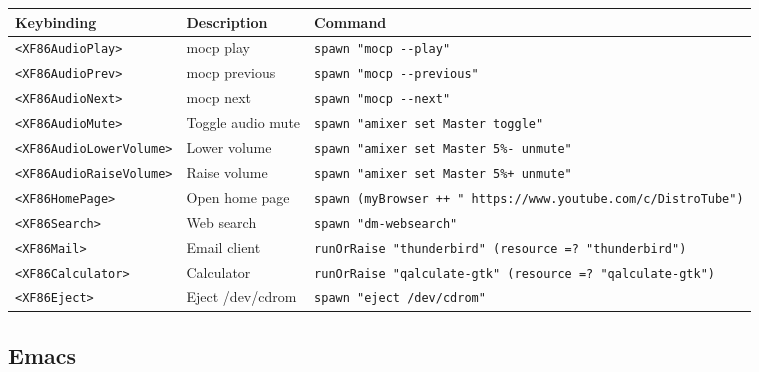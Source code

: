 \begin{longtable}[]{@{}
  >{\raggedright\arraybackslash}p{}
  >{\raggedright\arraybackslash}p{}
  >{\raggedright\arraybackslash}p{}@{}}
\toprule
Keybinding & Description & Command \\
\midrule
\endhead
\texttt{\textless{}XF86AudioPlay\textgreater{}} & mocp play &
\texttt{spawn\ "mocp\ -\/-play"} \\
\texttt{\textless{}XF86AudioPrev\textgreater{}} & mocp previous &
\texttt{spawn\ "mocp\ -\/-previous"} \\
\texttt{\textless{}XF86AudioNext\textgreater{}} & mocp next &
\texttt{spawn\ "mocp\ -\/-next"} \\
\texttt{\textless{}XF86AudioMute\textgreater{}} & Toggle audio mute &
\texttt{spawn\ "amixer\ set\ Master\ toggle"} \\
\texttt{\textless{}XF86AudioLowerVolume\textgreater{}} & Lower volume &
\texttt{spawn\ "amixer\ set\ Master\ 5\%-\ unmute"} \\
\texttt{\textless{}XF86AudioRaiseVolume\textgreater{}} & Raise volume &
\texttt{spawn\ "amixer\ set\ Master\ 5\%+\ unmute"} \\
\texttt{\textless{}XF86HomePage\textgreater{}} & Open home page &
\texttt{spawn\ (myBrowser\ ++\ "\ https://www.youtube.com/c/DistroTube")} \\
\texttt{\textless{}XF86Search\textgreater{}} & Web search &
\texttt{spawn\ "dm-websearch"} \\
\texttt{\textless{}XF86Mail\textgreater{}} & Email client &
\texttt{runOrRaise\ "thunderbird"\ (resource\ =?\ "thunderbird")} \\
\texttt{\textless{}XF86Calculator\textgreater{}} & Calculator &
\texttt{runOrRaise\ "qalculate-gtk"\ (resource\ =?\ "qalculate-gtk")} \\
\texttt{\textless{}XF86Eject\textgreater{}} & Eject /dev/cdrom &
\texttt{spawn\ "eject\ /dev/cdrom"} \\
\bottomrule
\end{longtable}

\hypertarget{emacs}{%
\subsection{Emacs}\label{emacs}}

